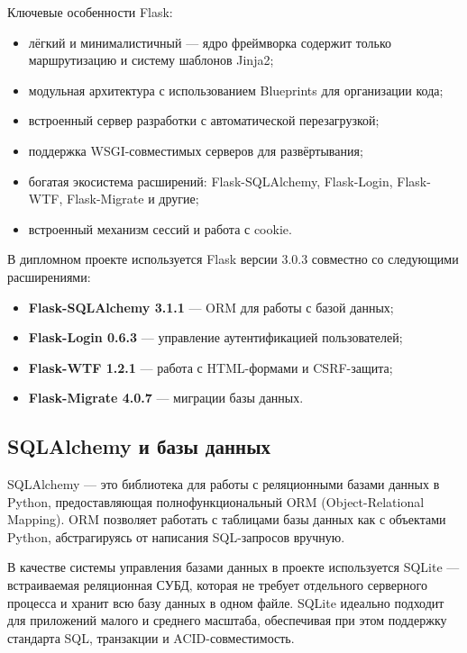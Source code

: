 \documentclass[14pt,a4paper,oneside]{extarticle}
\begin{document}
Ключевые особенности Flask:
\begin{itemize}[leftmargin=2cm]
    \item лёгкий и минималистичный --- ядро фреймворка содержит только маршрутизацию и систему шаблонов Jinja2;
    \item модульная архитектура с использованием Blueprints для организации кода;
    \item встроенный сервер разработки с автоматической перезагрузкой;
    \item поддержка WSGI-совместимых серверов для развёртывания;
    \item богатая экосистема расширений: Flask-SQLAlchemy, Flask-Login, Flask-WTF, Flask-Migrate и другие;
    \item встроенный механизм сессий и работа с cookie.
\end{itemize}

В дипломном проекте используется Flask версии 3.0.3 совместно со следующими расширениями:
\begin{itemize}[leftmargin=2cm]
    \item \textbf{Flask-SQLAlchemy 3.1.1} --- ORM для работы с базой данных;
    \item \textbf{Flask-Login 0.6.3} --- управление аутентификацией пользователей;
    \item \textbf{Flask-WTF 1.2.1} --- работа с HTML-формами и CSRF-защита;
    \item \textbf{Flask-Migrate 4.0.7} --- миграции базы данных.
\end{itemize}

\subsection{SQLAlchemy и базы данных}

SQLAlchemy --- это библиотека для работы с реляционными базами данных в Python, предоставляющая полнофункциональный ORM (Object-Relational Mapping). ORM позволяет работать с таблицами базы данных как с объектами Python, абстрагируясь от написания SQL-запросов вручную.

В качестве системы управления базами данных в проекте используется SQLite --- встраиваемая реляционная СУБД, которая не требует отдельного серверного процесса и хранит всю базу данных в одном файле. SQLite идеально подходит для приложений малого и среднего масштаба, обеспечивая при этом поддержку стандарта SQL, транзакции и ACID-совместимость.
\end{document}

